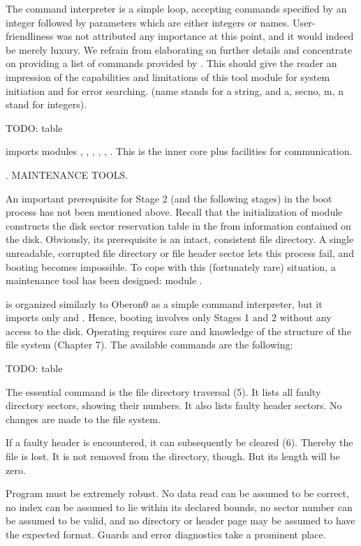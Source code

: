 \noindent The command interpreter is a simple loop, accepting commands specified by an integer followed by parameters which are either integers or names. User-friendliness was not attributed any importance at this point, and it would indeed be merely luxury. We refrain from elaborating on further details and concentrate on providing a list of commands provided by . This should give the reader an impression of the capabilities and limitations of this tool module for system initiation and for error searching. (name stands for a string, and a, secno, m, n stand for integers).

TODO: table

 imports modules , , , , , . This is the inner core plus facilities for communication.

. MAINTENANCE TOOLS.

An important prerequisite for Stage 2 (and the following stages) in the boot process has not been mentioned above. Recall that the initialization of module  constructs the disk sector reservation table in the  from information contained on the disk. Obviously, its prerequisite is an intact, consistent file directory. A single unreadable, corrupted file directory or file header sector lets this process fail, and booting becomes impossible. To cope with this (fortunately rare) situation, a maintenance tool has been designed: module .

 is organized similarly to Oberon0 as a simple command interpreter, but it imports only  and . Hence, booting involves only Stages 1 and 2 without any access to the disk. Operating  requires care and knowledge of the structure of the file system (Chapter 7). The available commands are the following:

TODO: table

The essential command is the file directory traversal (5). It lists all faulty directory sectors, showing their numbers. It also lists faulty header sectors. No changes are made to the file system.

If a faulty header is encountered, it can subsequently be cleared (6). Thereby the file is lost. It is not removed from the directory, though. But its length will be zero.

Program  must be extremely robust. No data read can be assumed to be correct, no index can be assumed to lie within its declared bounds, no sector number can be assumed to be valid, and no directory or header page may be assumed to have the expected format. Guards and error diagnostics take a prominent place.

